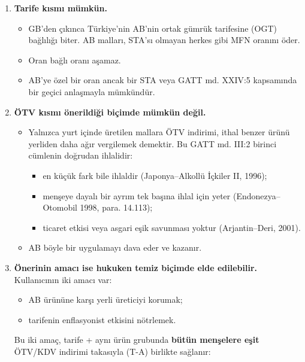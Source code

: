 \begin{enumerate}
\def\labelenumi{\arabic{enumi}.}
\item
  \textbf{Tarife kısmı mümkün.}

  \begin{itemize}
  \tightlist
  \item
    GB'den çıkınca Türkiye'nin AB'nin ortak gümrük tarifesine (OGT) bağlılığı biter. AB malları, STA'sı olmayan herkes gibi MFN oranını öder.
  \item
    Oran bağlı oranı aşamaz.
  \item
    AB'ye özel bir oran ancak bir STA veya GATT md. XXIV:5 kapsamında bir geçici anlaşmayla mümkündür.
  \end{itemize}
\item
  \textbf{ÖTV kısmı önerildiği biçimde mümkün değil.}

  \begin{itemize}
  \tightlist
  \item
    Yalnızca yurt içinde üretilen mallara ÖTV indirimi, ithal benzer ürünü yerliden daha ağır vergilemek demektir. Bu GATT md. III:2 birinci cümlenin doğrudan ihlalidir:

    \begin{itemize}
    \tightlist
    \item
      en küçük fark bile ihlaldir (Japonya--Alkollü İçkiler II, 1996);
    \item
      menşeye dayalı bir ayrım tek başına ihlal için yeter (Endonezya--Otomobil 1998, para. 14.113);
    \item
      ticaret etkisi veya asgari eşik savunması yoktur (Arjantin--Deri, 2001).
    \end{itemize}
  \item
    AB böyle bir uygulamayı dava eder ve kazanır.
  \end{itemize}
\item
  \textbf{Önerinin amacı ise hukuken temiz biçimde elde edilebilir.} Kullanıcının iki amacı var:

  \begin{itemize}
  \tightlist
  \item
    AB ürününe karşı yerli üreticiyi korumak;
  \item
    tarifenin enflasyonist etkisini nötrlemek.
  \end{itemize}

  Bu iki amaç, tarife + aynı ürün grubunda \textbf{bütün menşelere eşit} ÖTV/KDV indirimi takasıyla (T-A) birlikte sağlanır:


\end{enumerate}
